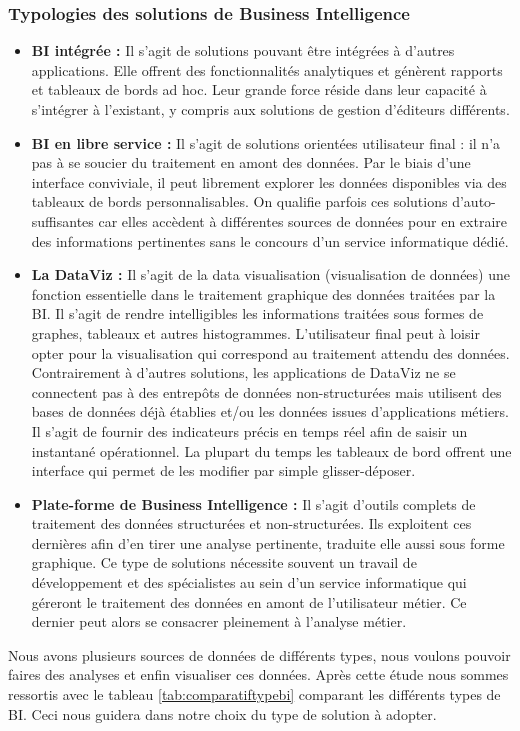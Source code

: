 \subsubsection{Typologies des solutions de Business Intelligence}
\begin{itemize}
    \item \textbf{BI intégrée :} Il s’agit de solutions pouvant être intégrées à d’autres applications. Elle offrent des fonctionnalités analytiques et génèrent rapports et tableaux de bords ad hoc. Leur grande force réside dans leur capacité à s’intégrer à l’existant, y compris aux solutions de gestion d’éditeurs différents.
    \item \textbf{BI en libre service :} Il s’agit de solutions orientées utilisateur final : il n’a pas à se soucier du traitement en amont des données. Par le biais d’une interface conviviale, il peut librement explorer les données disponibles via des tableaux de bords personnalisables. On qualifie parfois ces solutions d’auto-suffisantes car elles accèdent à différentes sources de données pour en extraire des informations pertinentes sans le concours d’un service informatique dédié.
    \item \textbf{La DataViz :} Il s’agit de la data visualisation (visualisation de données) une fonction essentielle dans le traitement graphique des données traitées par la BI. Il s’agit de rendre intelligibles les informations traitées sous formes de graphes, tableaux et autres histogrammes. L’utilisateur final peut à loisir opter pour la visualisation qui correspond au traitement attendu des données. Contrairement à d’autres solutions, les applications de DataViz ne se connectent pas à des entrepôts de données non-structurées mais utilisent des bases de données déjà établies et/ou les données issues d’applications métiers. Il s’agit de fournir des indicateurs précis en temps réel afin de saisir un instantané opérationnel. La plupart du temps les tableaux de bord offrent une interface qui permet de les modifier par simple glisser-déposer.
    \item \textbf{Plate-forme de Business Intelligence : } Il s’agit d’outils complets de traitement des données structurées et non-structurées. Ils exploitent ces dernières afin d’en tirer une analyse pertinente, traduite elle aussi sous forme graphique. Ce type de solutions nécessite souvent un travail de développement et des spécialistes au sein d’un service informatique qui géreront le traitement des données en amont de l’utilisateur métier. Ce dernier peut alors se consacrer pleinement à l’analyse métier.
\end{itemize}
Nous avons plusieurs sources de données de différents types, nous voulons pouvoir faires des analyses et enfin visualiser ces données. Après cette étude nous sommes ressortis avec le tableau \ref{tab:comparatiftypebi} comparant les différents types de BI. Ceci nous guidera dans notre choix du type de solution à adopter.

